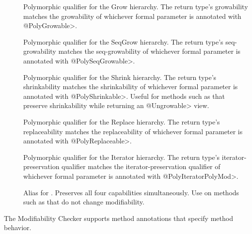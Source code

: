 \begin{description}

\item[]
Polymorphic qualifier for the Grow hierarchy.
The return type's growability matches the growability of whichever
formal parameter is annotated with \<@PolyGrowable>.

\item[]
Polymorphic qualifier for the SeqGrow hierarchy.
The return type's seq-growability matches the seq-growability of
whichever formal parameter is annotated with \<@PolySeqGrowable>.

\item[]
Polymorphic qualifier for the Shrink hierarchy.
The return type's shrinkability matches the shrinkability of
whichever formal parameter is annotated with \<@PolyShrinkable>.
Useful for methods such as  that preserve shrinkability while
returning an \<@Ungrowable> view.

\item[]
Polymorphic qualifier for the Replace hierarchy.
The return type's replaceability matches the replaceability of
whichever formal parameter is annotated with \<@PolyReplaceable>.

\item[]
Polymorphic qualifier for the Iterator hierarchy.
The return type's iterator-preservation qualifier matches the
iterator-preservation qualifier of whichever formal parameter is annotated
with \<@PolyIteratorPolyMod>.

\item[]
Alias for .
Preserves all four capabilities simultaneously.
Use on methods such as  that
do not change modifiability.

\end{description}



The Modifiability Checker supports method annotations that specify method
behavior.

